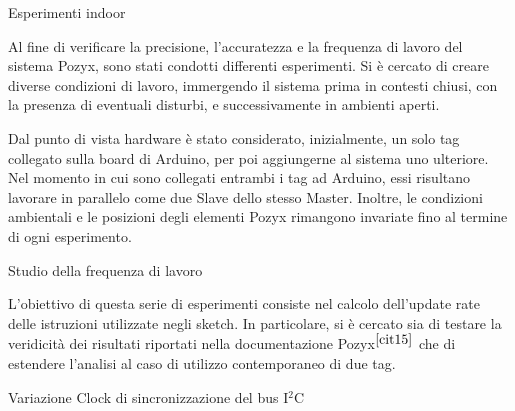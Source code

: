 \documentclass[12pt]{report}
\begin{document}
	\begin{section}{Esperimenti indoor}

		Al fine di verificare la precisione, l’accuratezza e la frequenza di lavoro del sistema Pozyx, sono stati condotti differenti esperimenti. Si è cercato di creare diverse condizioni di lavoro, immergendo il sistema prima in contesti chiusi, con la presenza di eventuali disturbi, e successivamente in ambienti aperti.

		Dal punto di vista hardware è stato considerato, inizialmente, un solo tag collegato sulla board di Arduino, per poi aggiungerne al sistema uno ulteriore. Nel momento in cui sono collegati entrambi i tag ad Arduino, essi risultano lavorare in parallelo come due Slave dello stesso Master. Inoltre, le condizioni 						ambientali e le posizioni degli elementi Pozyx rimangono invariate fino al termine di ogni esperimento.

		\begin{subsection}{Studio della frequenza di lavoro}

			L’obiettivo di questa serie di esperimenti consiste nel calcolo dell’update rate delle istruzioni utilizzate negli sketch. In particolare, si è cercato sia di testare la veridicità dei risultati riportati nella documentazione Pozyx$^{{\cite{cit15}}}$ che di estendere l'analisi al caso di utilizzo contemporaneo di due tag.

		\begin{subsubsection}{Variazione Clock di sincronizzazione del bus I$^2$C}


\end{subsubsection}
\end{subsection}
\end{section}
\end{document}
